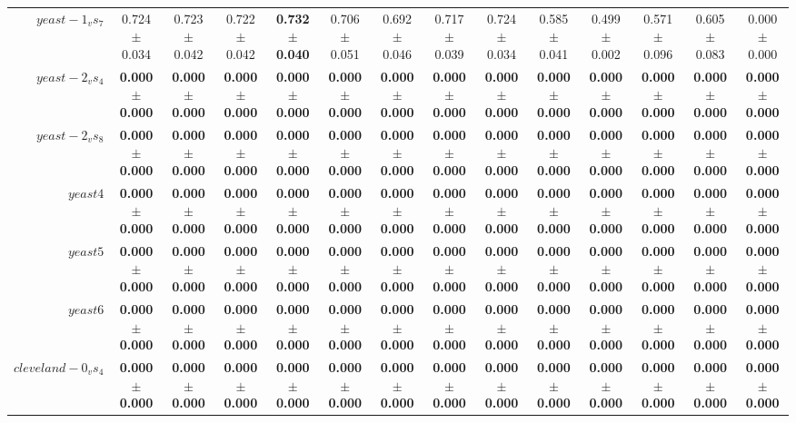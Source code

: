 \begin{table}[!ht]
{\begin{tabular}{r c c c c c c c c c c c c c}
$yeast-1_vs_7$ & 0.724 $\pm$ 0.034 & 0.723 $\pm$ 0.042 & 0.722 $\pm$ 0.042 & \textbf{0.732 $\pm$ 0.040} & 0.706 $\pm$ 0.051 & 0.692 $\pm$ 0.046 & 0.717 $\pm$ 0.039 & 0.724 $\pm$ 0.034 & 0.585 $\pm$ 0.041 & 0.499 $\pm$ 0.002 & 0.571 $\pm$ 0.096 & 0.605 $\pm$ 0.083 & 0.000 $\pm$ 0.000 \\
$yeast-2_vs_4$ & \textbf{0.000 $\pm$ 0.000} & \textbf{0.000 $\pm$ 0.000} & \textbf{0.000 $\pm$ 0.000} & \textbf{0.000 $\pm$ 0.000} & \textbf{0.000 $\pm$ 0.000} & \textbf{0.000 $\pm$ 0.000} & \textbf{0.000 $\pm$ 0.000} & \textbf{0.000 $\pm$ 0.000} & \textbf{0.000 $\pm$ 0.000} & \textbf{0.000 $\pm$ 0.000} & \textbf{0.000 $\pm$ 0.000} & \textbf{0.000 $\pm$ 0.000} & \textbf{0.000 $\pm$ 0.000} \\
$yeast-2_vs_8$ & \textbf{0.000 $\pm$ 0.000} & \textbf{0.000 $\pm$ 0.000} & \textbf{0.000 $\pm$ 0.000} & \textbf{0.000 $\pm$ 0.000} & \textbf{0.000 $\pm$ 0.000} & \textbf{0.000 $\pm$ 0.000} & \textbf{0.000 $\pm$ 0.000} & \textbf{0.000 $\pm$ 0.000} & \textbf{0.000 $\pm$ 0.000} & \textbf{0.000 $\pm$ 0.000} & \textbf{0.000 $\pm$ 0.000} & \textbf{0.000 $\pm$ 0.000} & \textbf{0.000 $\pm$ 0.000} \\
$yeast4$ & \textbf{0.000 $\pm$ 0.000} & \textbf{0.000 $\pm$ 0.000} & \textbf{0.000 $\pm$ 0.000} & \textbf{0.000 $\pm$ 0.000} & \textbf{0.000 $\pm$ 0.000} & \textbf{0.000 $\pm$ 0.000} & \textbf{0.000 $\pm$ 0.000} & \textbf{0.000 $\pm$ 0.000} & \textbf{0.000 $\pm$ 0.000} & \textbf{0.000 $\pm$ 0.000} & \textbf{0.000 $\pm$ 0.000} & \textbf{0.000 $\pm$ 0.000} & \textbf{0.000 $\pm$ 0.000} \\
$yeast5$ & \textbf{0.000 $\pm$ 0.000} & \textbf{0.000 $\pm$ 0.000} & \textbf{0.000 $\pm$ 0.000} & \textbf{0.000 $\pm$ 0.000} & \textbf{0.000 $\pm$ 0.000} & \textbf{0.000 $\pm$ 0.000} & \textbf{0.000 $\pm$ 0.000} & \textbf{0.000 $\pm$ 0.000} & \textbf{0.000 $\pm$ 0.000} & \textbf{0.000 $\pm$ 0.000} & \textbf{0.000 $\pm$ 0.000} & \textbf{0.000 $\pm$ 0.000} & \textbf{0.000 $\pm$ 0.000} \\
$yeast6$ & \textbf{0.000 $\pm$ 0.000} & \textbf{0.000 $\pm$ 0.000} & \textbf{0.000 $\pm$ 0.000} & \textbf{0.000 $\pm$ 0.000} & \textbf{0.000 $\pm$ 0.000} & \textbf{0.000 $\pm$ 0.000} & \textbf{0.000 $\pm$ 0.000} & \textbf{0.000 $\pm$ 0.000} & \textbf{0.000 $\pm$ 0.000} & \textbf{0.000 $\pm$ 0.000} & \textbf{0.000 $\pm$ 0.000} & \textbf{0.000 $\pm$ 0.000} & \textbf{0.000 $\pm$ 0.000} \\
$cleveland-0_vs_4$ & \textbf{0.000 $\pm$ 0.000} & \textbf{0.000 $\pm$ 0.000} & \textbf{0.000 $\pm$ 0.000} & \textbf{0.000 $\pm$ 0.000} & \textbf{0.000 $\pm$ 0.000} & \textbf{0.000 $\pm$ 0.000} & \textbf{0.000 $\pm$ 0.000} & \textbf{0.000 $\pm$ 0.000} & \textbf{0.000 $\pm$ 0.000} & \textbf{0.000 $\pm$ 0.000} & \textbf{0.000 $\pm$ 0.000} & \textbf{0.000 $\pm$ 0.000} & \textbf{0.000 $\pm$ 0.000} \\

\end{tabular}}
\end{table}
